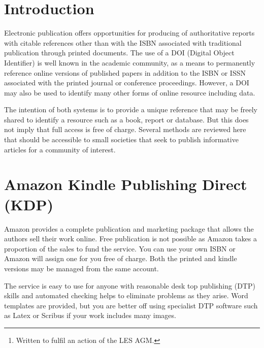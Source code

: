 \documentclass{article}
\title{\myTitleMainTitle}
\author{
    Dr Paul J. Palmer
    \thanks{Written to fulfil an action of the LES AGM.}
   \\
    Leicestershire Entomological Society \\
  \texttt{\href{mailto:palmerpjp@gmail.com}{\nolinkurl{palmerpjp@gmail.com}}} 
}
\begin{document}
\maketitle


\begin{abstract}
\myAbstract
\end{abstract}


\hypertarget{introduction}{%
\section{Introduction}\label{introduction}}

Electronic publication offers opportunities for producing of authoritative reports with citable references other than with the ISBN associated with traditional publication through printed documents. The use of a DOI (Digital Object Identifier) is well known in the academic community, as a means to permanently reference online versions of published papers in addition to the ISBN or ISSN associated with the printed journal or conference proceedings. However, a DOI may also be used to identify many other forms of online resource including data.

The intention of both systems is to provide a unique reference that may be freely shared to identify a resource such as a book, report or database. But this does not imply that full access is free of charge.  Several methods are reviewed here that should be accessible to small societies that seek to publish informative articles for a community of interest.

\section{Amazon Kindle Publishing Direct (KDP)}

Amazon provides a complete publication and marketing package that allows the authors sell their work online. Free publication is not possible as Amazon takes a proportion of the sales to fund the service. You can use your own ISBN or Amazon will assign one for you free of charge. Both the printed and kindle versions may be managed from the same account.

The service is easy to use for anyone with reasonable desk top publishing (DTP) skills and automated checking helps to eliminate problems as they arise. Word templates are provided, but you are better off using specialist DTP software such as Latex or Scribus if your work includes many images.
\end{document}

